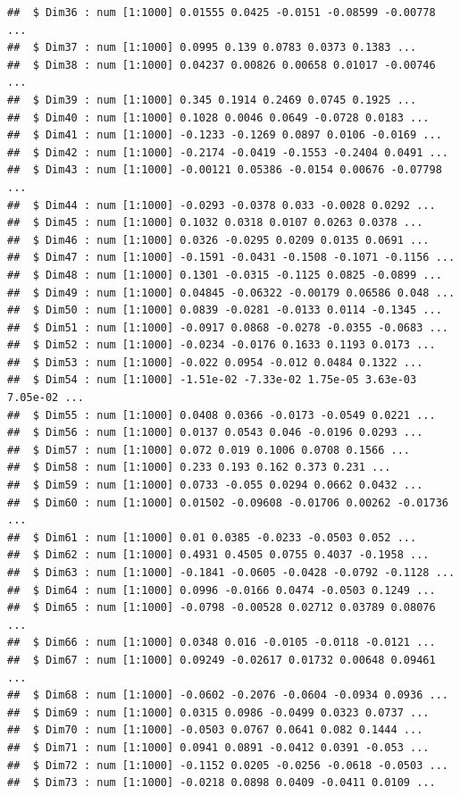 \documentclass[
  english,
  man]{apa6}
\begin{document}
\begin{verbatim}
##  $ Dim36 : num [1:1000] 0.01555 0.0425 -0.0151 -0.08599 -0.00778 ...
##  $ Dim37 : num [1:1000] 0.0995 0.139 0.0783 0.0373 0.1383 ...
##  $ Dim38 : num [1:1000] 0.04237 0.00826 0.00658 0.01017 -0.00746 ...
##  $ Dim39 : num [1:1000] 0.345 0.1914 0.2469 0.0745 0.1925 ...
##  $ Dim40 : num [1:1000] 0.1028 0.0046 0.0649 -0.0728 0.0183 ...
##  $ Dim41 : num [1:1000] -0.1233 -0.1269 0.0897 0.0106 -0.0169 ...
##  $ Dim42 : num [1:1000] -0.2174 -0.0419 -0.1553 -0.2404 0.0491 ...
##  $ Dim43 : num [1:1000] -0.00121 0.05386 -0.0154 0.00676 -0.07798 ...
##  $ Dim44 : num [1:1000] -0.0293 -0.0378 0.033 -0.0028 0.0292 ...
##  $ Dim45 : num [1:1000] 0.1032 0.0318 0.0107 0.0263 0.0378 ...
##  $ Dim46 : num [1:1000] 0.0326 -0.0295 0.0209 0.0135 0.0691 ...
##  $ Dim47 : num [1:1000] -0.1591 -0.0431 -0.1508 -0.1071 -0.1156 ...
##  $ Dim48 : num [1:1000] 0.1301 -0.0315 -0.1125 0.0825 -0.0899 ...
##  $ Dim49 : num [1:1000] 0.04845 -0.06322 -0.00179 0.06586 0.048 ...
##  $ Dim50 : num [1:1000] 0.0839 -0.0281 -0.0133 0.0114 -0.1345 ...
##  $ Dim51 : num [1:1000] -0.0917 0.0868 -0.0278 -0.0355 -0.0683 ...
##  $ Dim52 : num [1:1000] -0.0234 -0.0176 0.1633 0.1193 0.0173 ...
##  $ Dim53 : num [1:1000] -0.022 0.0954 -0.012 0.0484 0.1322 ...
##  $ Dim54 : num [1:1000] -1.51e-02 -7.33e-02 1.75e-05 3.63e-03 7.05e-02 ...
##  $ Dim55 : num [1:1000] 0.0408 0.0366 -0.0173 -0.0549 0.0221 ...
##  $ Dim56 : num [1:1000] 0.0137 0.0543 0.046 -0.0196 0.0293 ...
##  $ Dim57 : num [1:1000] 0.072 0.019 0.1006 0.0708 0.1566 ...
##  $ Dim58 : num [1:1000] 0.233 0.193 0.162 0.373 0.231 ...
##  $ Dim59 : num [1:1000] 0.0733 -0.055 0.0294 0.0662 0.0432 ...
##  $ Dim60 : num [1:1000] 0.01502 -0.09608 -0.01706 0.00262 -0.01736 ...
##  $ Dim61 : num [1:1000] 0.01 0.0385 -0.0233 -0.0503 0.052 ...
##  $ Dim62 : num [1:1000] 0.4931 0.4505 0.0755 0.4037 -0.1958 ...
##  $ Dim63 : num [1:1000] -0.1841 -0.0605 -0.0428 -0.0792 -0.1128 ...
##  $ Dim64 : num [1:1000] 0.0996 -0.0166 0.0474 -0.0503 0.1249 ...
##  $ Dim65 : num [1:1000] -0.0798 -0.00528 0.02712 0.03789 0.08076 ...
##  $ Dim66 : num [1:1000] 0.0348 0.016 -0.0105 -0.0118 -0.0121 ...
##  $ Dim67 : num [1:1000] 0.09249 -0.02617 0.01732 0.00648 0.09461 ...
##  $ Dim68 : num [1:1000] -0.0602 -0.2076 -0.0604 -0.0934 0.0936 ...
##  $ Dim69 : num [1:1000] 0.0315 0.0986 -0.0499 0.0323 0.0737 ...
##  $ Dim70 : num [1:1000] -0.0503 0.0767 0.0641 0.082 0.1444 ...
##  $ Dim71 : num [1:1000] 0.0941 0.0891 -0.0412 0.0391 -0.053 ...
##  $ Dim72 : num [1:1000] -0.1152 0.0205 -0.0256 -0.0618 -0.0503 ...
##  $ Dim73 : num [1:1000] -0.0218 0.0898 0.0409 -0.0411 0.0109 ...

\end{verbatim}
\end{document}
